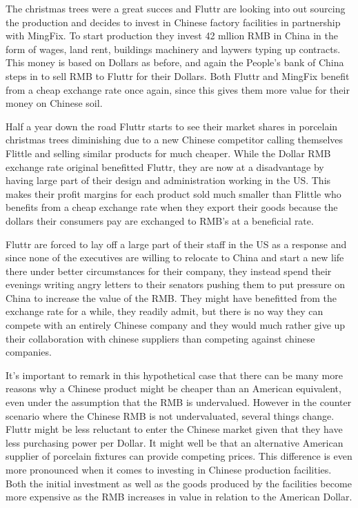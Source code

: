 \documentclass[11pt]{article}
\begin{document}
The christmas trees were a great succes and Fluttr are looking into out 
sourcing the production and decides to invest in Chinese factory 
facilities in partnership with MingFix. To start production they invest 
42 mllion RMB in China in the form of wages, land rent, buildings 
machinery and laywers typing up contracts.  This money is based on 
Dollars as before, and again the People's bank of China steps in to sell 
RMB to Fluttr for their Dollars.  Both Fluttr and MingFix benefit from a 
cheap exchange rate once again, since this gives them more value for 
their money on Chinese soil.

Half a year down the road Fluttr starts to see their market shares in 
porcelain christmas trees diminishing due to a new Chinese competitor 
calling themselves Flittle and selling similar products for much 
cheaper.  While the Dollar RMB exchange rate original benefitted Fluttr, 
they are now at a disadvantage by having large part of their design and 
administration working in the US. This makes their profit margins for 
each product sold much smaller than Flittle who benefits from a cheap 
exchange rate when they export their goods because the dollars their 
consumers pay are exchanged to RMB's at a beneficial rate.

Fluttr are forced to lay off a large part of their staff in the US as a 
response and since none of the executives are willing to relocate to 
China and start a new life there under better circumstances for their 
company, they instead spend their evenings writing angry letters to 
their senators pushing them to put pressure on China to increase the 
value of the RMB. They might have benefitted from the exchange rate for 
a while, they readily admit, but there is no way they can compete with 
an entirely Chinese company and they would much rather give up their 
collaboration with chinese suppliers than competing against chinese 
companies.


It's important to remark in this hypothetical case that there can be 
many more reasons why a Chinese product might be cheaper than an 
American equivalent, even under the assumption that the RMB is 
undervalued. However in the counter scenario where the Chinese RMB is 
not undervaluated, several things change. Fluttr might be less reluctant 
to enter the Chinese market given that they have less purchasing power 
per Dollar. It might well be that an alternative American supplier of 
porcelain fixtures can provide competing prices. This difference is even 
more pronounced when it comes to investing in Chinese production 
facilities. Both the initial investment as well as the goods produced by 
the facilities become more expensive as the RMB increases in value in 
relation to the American Dollar.
\end{document}
